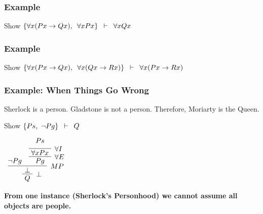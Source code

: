 \documentclass{beamer}
\theoremstyle{indentDefn} \newtheorem{defn}[]{Definition}
\begin{document}
\begin{frame}
	\frametitle{Example}
	
	Show $\{\forall x (Px \rightarrow Qx), \hspace{0.5em} \forall x Px\} \hspace{0.5em} \vdash \hspace{0.5em} \forall x Qx$
	
	\vspace{7cm}
	
\end{frame}

\begin{frame}
	\frametitle{Example}
	
	Show $\{\forall x (Px \rightarrow Qx), \hspace{0.5em} \forall x (Qx \rightarrow Rx)\} \hspace{0.5em} \vdash \hspace{0.5em} \forall x (Px \rightarrow Rx)$
	
	
	\vspace{7cm}
	
\end{frame}

\begin{frame}
	\frametitle{Example: When Things Go Wrong}
	
	Sherlock is a person. Gladstone is not a person. Therefore, Moriarty is the Queen.
	
	\vspace{0.5cm}
	
	Show $\{Ps, \ \lnot Pg\} \hspace{0.5em} \vdash \hspace{0.5em} Q$
	
	
	\begin{center}
		$\begin{array}{c}
			\infer[\bot]{Q}
				{\infer[MP]{ \ \bot \ }{\lnot Pg & \infer[\forall E]{ \ Pg \ }{\infer[\forall I]{ \ \forall x Px \ }{Ps\vspace{0.2cm}}}}}
		\end{array}$
	\end{center}
	
	\pause
	{\bf From one instance (Sherlock's Personhood) we cannot assume all objects are people.}
	
\end{frame}
\end{document}

